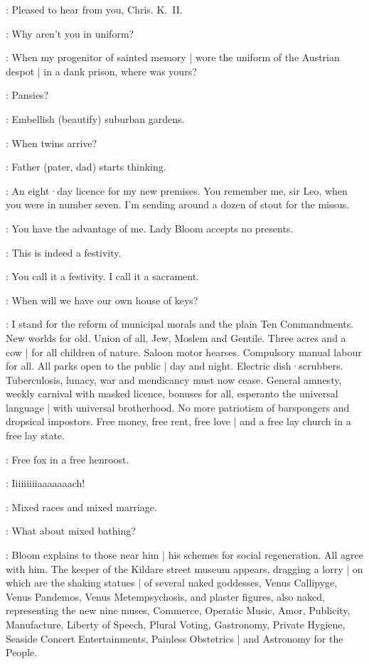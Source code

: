 \Bloom:
Pleased to hear from you,
Chris.
K.~II.

\JoeHynes[2]:
Why aren't you in uniform?%

\Bloom:
When my progenitor of sainted memory |
wore the uniform of the Austrian despot |
in a dank prison,
where was yours?

\BenDollard[1]:
Pansies?

\Bloom:
Embellish (beautify) suburban gardens.

\BenDollard[1]:
When twins arrive?

\Bloom:
Father (pater, dad) starts thinking.

\LarryORourke[2]:
An eight·day licence for my new premises.
You remember me,
sir Leo,
when you were in number seven.
I'm sending around a dozen of stout for the missus.

\Bloom:
You have the advantage of me.
Lady Bloom accepts no presents.

\Crofton[1]:
This is indeed a festivity.

\Bloom:
You call it a festivity.
I call it a sacrament.

\AlexanderKeyes[2]:
When will we have our own house of keys?

\Bloom:
I stand for the reform of municipal morals and the plain Ten Commandments.
New worlds for old.
Union of all,
Jew,
Moslem and Gentile.
Three acres and a cow |
for all children of nature.
Saloon motor hearses.
Compulsory manual labour for all.
All parks open to the public |
day and night.
Electric dish·scrubbers.
Tuberculosis,
lunacy,
war and mendicancy must now cease.
General amnesty,
weekly carnival with masked licence,
bonuses for all,
esperanto the universal language |
with universal brotherhood.
No more patriotism of barspongers and dropsical impostors.
Free money,
free rent,
free love |
and a free lay church in a free lay state.

\OMaddenBurke[1]:
Free fox in a free henroost.

\DavyByrne[2]:
Iiiiiiiiiaaaaaaach!

\Bloom:
Mixed races and mixed marriage.

\Lenehan[1]:
What about mixed bathing?

:
Bloom explains to those near him |
his schemes for social regeneration.
All agree with him.
The keeper of the Kildare street museum appears,
dragging a lorry |
on which are the shaking statues |
of several naked goddesses,
Venus Callipyge,
Venus Pandemos,
Venus Metempsychosis,
and plaster figures,
also naked,
representing the new nine muses,
Commerce,
Operatic Music,
Amor,
Publicity,
Manufacture,
Liberty of Speech,
Plural Voting,
Gastronomy,
Private Hygiene,
Seaside Concert Entertainments,
Painless Obstetrics |
and Astronomy for the People.

